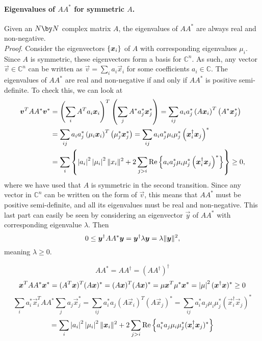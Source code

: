 \documentclass[english, notitlepage]{article}
\begin{document}
    \paragraph{Eigenvalues of \(AA^\ast\) for symmetric \(A\).}
    Given an \(N \by N\) complex matrix \(A\), the eigenvalues of \(AA^\ast\) are always real and non-negative.\\
    \emph{Proof}.
    Consider the eigenvectors \(\left\{\boldsymbol{x}_i\right\}\) of \(A\) with corresponding eigenvalues \(\mu_i\).
    Since \(A\) is symmetric, these eigenvectors form a basis for \(\mathbb{C}^n\).
    As such, any vector \(\vec{v} \in \mathbb{C}^n\) can be written as \(\vec{v} = \sum_i a_i \vec{x}_i\) for some coefficients \(a_i \in \mathbb{C}\).
    The eigenvalues of \(AA^\ast\) are real and non-negative if and only if \(AA^\ast\) is positive semi-definite.
    To check this, we can look at
    \begin{align*}
        \boldsymbol{v}^T AA^\ast \boldsymbol{v}^\ast
        &= \left(\sum_i A^T a_i \boldsymbol{x}_i\right)^T \left(\sum_j A^\ast a_j^\ast \boldsymbol{x}_j^\ast\right)
        = \sum_{ij} a_i a_j^\ast \left(A \boldsymbol{x}_i\right)^T \left(A^\ast \boldsymbol{x}_j^\ast\right) \\
        &= \sum_{ij} a_i a_j^\ast \left(\mu_i \boldsymbol{x}_i\right)^T \left(\mu_j^\ast \boldsymbol{x}_j^\ast\right)
        = \sum_{ij} a_i a_j^\ast \mu_i \mu_j^\ast \left(\boldsymbol{x}_i^\dagger \boldsymbol{x}_j\right)^\ast \\
        &= \sum_i \left\{\left|a_i\right|^2 \left|\mu_i\right|^2 \|x_i\|_{}^2 + 2\sum_{j>i} \operatorname{Re}\left\{a_i a_j^\ast \mu_i \mu_j^\ast \left(\boldsymbol{x}_i^\dagger \boldsymbol{x}_j\right)^\ast\right\}\right\}
        \geq 0,
    \end{align*}
    where we have used that \(A\) is symmetric in the second transition.
    Since any vector in \(\mathbb{C}^n\) can be written on the form of \(\vec{v}\), this means that \(AA^\ast\) must be positive semi-definite, and all its eigenvalues must be real and non-negative.
    This last part can easily be seen by considering an eigenvector \(\vec{y}\) of \(AA^\ast\) with corresponding eigenvalue \(\lambda\).
    Then
    \[0 \leq \boldsymbol{y}^\dagger AA^\ast \boldsymbol{y} = \boldsymbol{y}^\dagger \lambda \boldsymbol{y} = \lambda \|\boldsymbol{y}\|_{}^2,\]
    meaning \(\lambda \geq 0\).

    \[AA^\ast = AA^\dagger = (AA^\dagger)^\dagger\]
    \[\boldsymbol{x}^T A A^\ast \boldsymbol{x}^\ast = (A^T \boldsymbol{x})^T (A \boldsymbol{x})^\ast = (A \boldsymbol{x})^T (A \boldsymbol{x})^\ast = \mu \boldsymbol{x}^T \mu^\ast \boldsymbol{x}^\ast = \left|\mu\right|^2 (\boldsymbol{x}^\dagger \boldsymbol{x})^\ast \geq 0\]
    \[\sum_i a_i^\ast \vec{x}_i^T A A^\ast \sum_j a_j \vec{x}_j^\ast = \sum_{ij} a_i^\ast a_j (A \vec{x}_i)^T (A\vec{x}_j)^\ast = \sum_{ij} a_i^\ast a_j \mu_i \mu_j^\ast (\vec{x}_i^\dagger \vec{x}_j)^\ast\]
    \[= \sum_i \left|a_i\right|^2 \left|\mu_i\right|^2 \|\boldsymbol{x}_i\|_{}^2 + 2\sum_{j>i} \operatorname{Re}\left\{a_i^\ast a_j \mu_i \mu_j^\ast (\boldsymbol{x}_i^\dagger \boldsymbol{x}_j)^\ast\right\}\]
\end{document}
